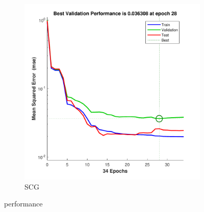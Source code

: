 \documentclass[12pt,a4paper]{article}
\begin{document}
\begin{CJK}{UTF8}{bsmi}
\begin{enumerate}
\begin{enumerate}
\begin{figure}[H]
\begin{subfigure}{.5\textwidth}
	 		\end{subfigure}%
	 		\begin{subfigure}{.5\textwidth}
	 			\centering
	 			\includegraphics[width=1\linewidth]{breast_scg_per}
	 			\caption{SCG}
	 			
	 		\end{subfigure}
	 		\caption{performance}
	 		
	 	\end{figure}
	 	

\end{enumerate}
\end{enumerate}
\end{CJK}
\end{document}
